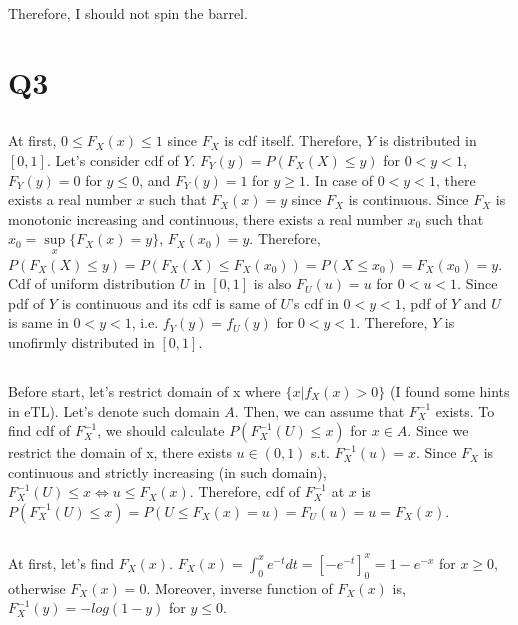 \documentclass{article}
\begin{document}
Therefore, I should not spin the barrel.

\section{Q3}

\subsection{}
At first, $0 \leq F_X(x) \leq 1$ since $F_X$ is cdf itself.
Therefore, $Y$ is distributed in $[0,1]$.
Let's consider cdf of $Y$.
$F_Y(y) = P(F_X(X) \leq y)$ for $0 < y < 1$, $F_Y(y) = 0$ for $y \leq 0$,
    and $F_Y(y) = 1$ for $y \geq 1$.
In case of $0 < y < 1$, there exists a real number $x$ such that $F_X(x)=y$
    since $F_X$ is continuous.
Since $F_X$ is monotonic increasing and continuous,
    there exists a real number $x_0$
    such that $x_0 = \sup\limits_{x}\{F_X(x)=y\}$, $F_X(x_0)=y$.
Therefore,
$P(F_X(X) \leq y)
= P(F_X(X) \leq F_X(x_0))
= P(X \leq x_0)
= F_X(x_0)
= y$.
Cdf of uniform distribution $U$ in $[0,1]$ is also $F_U(u)=u$ for $0 < u < 1$.
Since pdf of $Y$ is continuous and its cdf is same of $U$'s cdf in $0 < y < 1$,
    pdf of $Y$ and $U$ is same in $0 < y < 1$, i.e. $f_Y(y)=f_U(y)$ for $0 < y < 1$.
Therefore, $Y$ is unofirmly distributed in $[0,1]$.

\subsection{}
Before start, let's restrict domain of x where $\{x|f_X(x) > 0\}$ (I found some hints in eTL).
Let's denote such domain $A$.
Then, we can assume that $F_X^{-1}$ exists.
To find cdf of $F_X^{-1}$, we should calculate $P(F_X^{-1}(U) \leq x)$ for $x \in A$.
Since we restrict the domain of x, there exists $u \in (0,1)$ s.t. $F_X^{-1}(u)=x$.
Since $F_X$ is continuous and strictly increasing (in such domain),
    $F_X^{-1}(U) \leq x \iff u \leq F_X(x)$.
Therefore, cdf of $F_X^{-1}$ at $x$ is
$P(F_X^{-1}(U) \leq x)
= P(U \leq F_X(x) = u)
= F_U(u)
= u
= F_X(x)$.

\subsection{}
At first, let's find $F_X(x)$.
$F_X(x) = \int_{0}^{x}e^{-t}dt
= [-e^{-t}]_{0}^{x}
= 1 - e^{-x}$
for $x \geq 0$, otherwise $F_X(x)=0$.
Moreover, inverse function of $F_X(x)$ is,
$F_X^{-1}(y) = -log(1-y)$ for $y \leq 0$. \\
\end{document}
